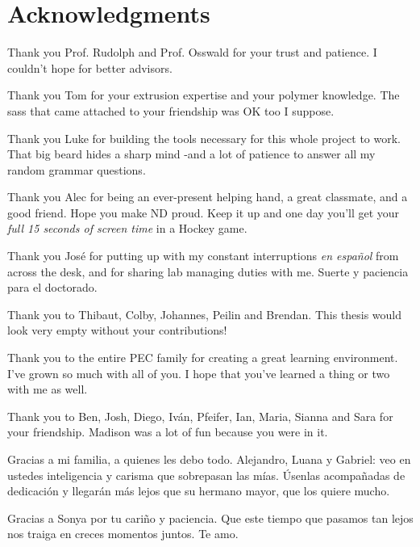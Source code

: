 \documentclass[main.tex]{subfiles}
\begin{document}
\chapter*{Acknowledgments}
{
\setlength{\parindent}{0cm}
\setlength{\parskip}{12pt}
Thank you Prof. Rudolph and Prof. Osswald for your trust and patience. I couldn't hope for better advisors.
     
Thank you Tom for your extrusion expertise and your polymer knowledge. The sass that came attached to your friendship was OK too I suppose.

Thank you Luke for building the tools necessary for this whole project to work. That big beard hides a sharp mind -and a lot of patience to answer all my random grammar questions.

Thank you Alec for being an ever-present helping hand, a great classmate, and a good friend. Hope you make ND proud. Keep it up and one day you'll get your \emph{full 15 seconds of screen time} in a Hockey game.

Thank you Jos\'e for putting up with my constant interruptions \emph{en espa\~nol} from across the desk, and for sharing lab managing duties with me. Suerte y paciencia para el doctorado. 

Thank you to Thibaut, Colby, Johannes, Peilin and Brendan. This thesis would look very empty without your contributions!
    
Thank you to the entire PEC family for creating a great learning environment. I've grown so much with all of you. I hope that you've learned a thing or two with me as well.

Thank you to Ben, Josh, Diego, Iv\'an, Pfeifer, Ian, Maria, Sianna and Sara for your friendship. Madison was a lot of fun because you were in it.

Gracias a mi familia, a quienes les debo todo. Alejandro, Luana y Gabriel: veo en ustedes inteligencia y carisma que sobrepasan las m\'ias. \'Usenlas acompa\~nadas de dedicaci\'on y llegar\'an m\'as lejos que su hermano mayor, que los quiere mucho. 

Gracias a Sonya por tu cari\~no y paciencia. Que este tiempo que pasamos tan lejos nos traiga en creces momentos juntos. Te amo.  
}
\end{document}
